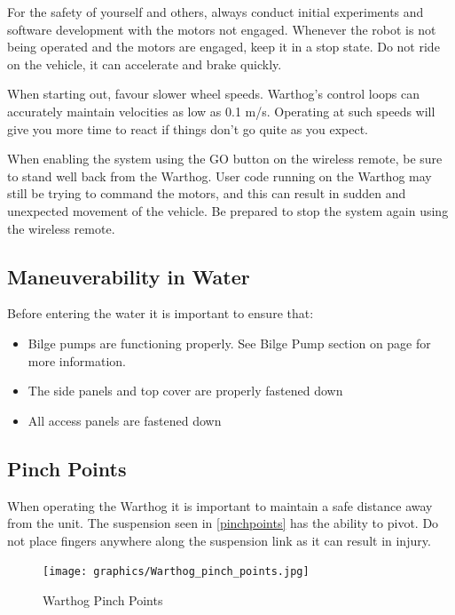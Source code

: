 \documentclass[]{clearpath-latex/clearpath-manual}
\begin{document}
For the safety of yourself and others, always conduct initial experiments and software development with the motors not engaged.  Whenever the robot is not being operated and the motors are engaged, keep it in a stop state.  Do not ride on the vehicle, it can accelerate and brake quickly.

When starting out, favour slower wheel speeds. Warthog's control loops can accurately maintain velocities as low as 0.1 m/s. Operating at such speeds will give you more time to react if things don’t go quite as you expect.

When enabling the system using the GO button on the wireless remote, be sure to stand well back from the Warthog. User code running on the Warthog may still be trying to command the motors, and this can result in sudden and unexpected movement of the vehicle. Be prepared to stop the system again using the wireless remote.


\subsection{Maneuverability in Water}

Before entering the water it is important to ensure that:

\begin{itemize}[nolistsep]
  \item Bilge pumps are functioning properly.  See Bilge Pump section on page \pageref{bilgepumps} for more information.
  \item The side panels and top cover are properly fastened down
  \item All access panels are fastened down
\end{itemize}


\subsection{Pinch Points}

When operating the Warthog  it is important to maintain a safe distance away from the unit. The suspension seen in \autoref{pinchpoints} has the ability to pivot.  Do not place fingers anywhere along the suspension link as it can result in injury.

\begin{figure}[!htb]
  \centering
  \texttt{[image: graphics/Warthog\_pinch\_points.jpg]}
  \caption{Warthog Pinch Points}
  \label{pinchpoints}
\end{figure}
\end{document}
